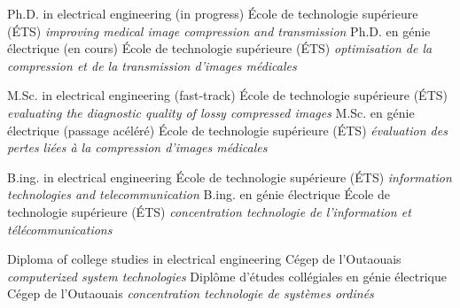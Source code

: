 \documentclass[print]{friggeri-cv}
\begin{document}


\begin{entrylist}
  \engfr
  { {Ph.D. in electrical engineering (in progress)} {École de technologie supérieure {\scriptsize (ÉTS)}} {\emph{improving medical image compression and transmission}}}
  { {Ph.D. en génie électrique (en cours)} {École de technologie supérieure {\scriptsize (ÉTS)}} {\emph{optimisation de la compression et de la transmission d'images médicales}}}

  \engfr
  { {M.Sc. in electrical engineering (fast-track\textsuperscript{\tiny\textdaggerdbl})} {École de technologie supérieure {\scriptsize (ÉTS)}} {\emph{evaluating the diagnostic quality of lossy compressed images}}}
  { {M.Sc. en génie électrique (passage acéléré\textsuperscript{\tiny\textdaggerdbl})} {École de technologie supérieure {\scriptsize (ÉTS)}} {\emph{évaluation des pertes liées à la compression d'images médicales}}}

  \engfr
  { {B.ing. in electrical engineering} {École de technologie supérieure {\scriptsize (ÉTS)}} {\emph{information technologies and telecommunication}}}
  { {B.ing. en génie électrique} {École de technologie supérieure {\scriptsize (ÉTS)}} {\emph{concentration technologie de l'information et télécommunications}}}

  \engfr
  { {Diploma of college studies in electrical engineering} {Cégep de l’Outaouais} {\emph{computerized system technologies}}}
  { {Diplôme d'études collégiales en génie électrique} {Cégep de l’Outaouais} {\emph{concentration technologie de systèmes ordinés}}}
\end{entrylist}


\end{document}
